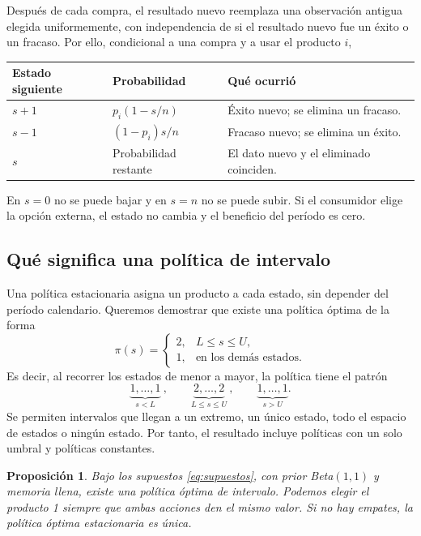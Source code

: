 \documentclass[11pt,a4paper]{article}
\newtheorem{proposicion}{Proposición}
\begin{document}
Después de cada compra, el resultado nuevo reemplaza una observación
antigua elegida uniformemente, con independencia de si el resultado
nuevo fue un éxito o un fracaso. Por ello, condicional a una compra
y a usar el producto $i$,
\begin{center}
\begin{tabular}{lll}
\toprule
Estado siguiente & Probabilidad & Qué ocurrió \\
\midrule
$s+1$ & $p_i(1-s/n)$ & Éxito nuevo; se elimina un fracaso. \\
$s-1$ & $(1-p_i)s/n$ & Fracaso nuevo; se elimina un éxito. \\
$s$ & Probabilidad restante & El dato nuevo y el eliminado coinciden. \\
\bottomrule
\end{tabular}
\end{center}
En $s=0$ no se puede bajar y en $s=n$ no se puede subir. Si el
consumidor elige la opción externa, el estado no cambia y el beneficio
del período es cero.

\subsection{Qué significa una política de intervalo}

Una política estacionaria asigna un producto a cada estado, sin
depender del período calendario. Queremos demostrar que existe una
política óptima de la forma
\begin{equation}
\pi(s)=
\begin{cases}
2,&L\le s\le U,\\
1,&\text{en los demás estados}.
\end{cases}
\label{eq:band-policy}
\end{equation}
Es decir, al recorrer los estados de menor a mayor, la política tiene
el patrón
\[
\underbrace{1,\ldots,1}_{s<L}\ ,\qquad
\underbrace{2,\ldots,2}_{L\le s\le U}\ ,\qquad
\underbrace{1,\ldots,1}_{s>U}.
\]
Se permiten intervalos que llegan a un extremo, un único estado,
todo el espacio de estados o ningún estado. Por tanto, el resultado
incluye políticas con un solo umbral y políticas constantes.

\begin{proposicion}\label{prop:intervalo}
Bajo los supuestos \eqref{eq:supuestos}, con prior Beta$(1,1)$ y
memoria llena, existe una política óptima de intervalo. Podemos
elegir el producto 1 siempre que ambas acciones den el mismo valor.
Si no hay empates, la política óptima estacionaria es única.
\end{proposicion}
\end{document}
